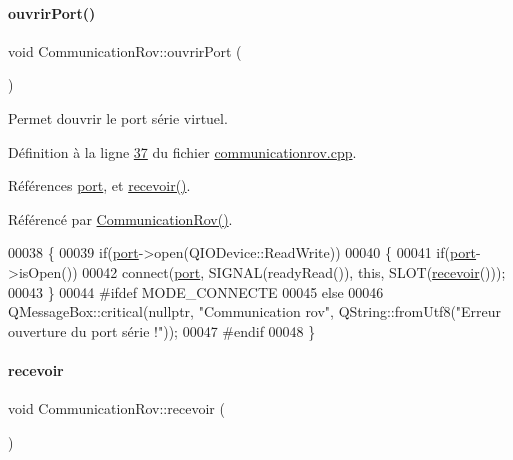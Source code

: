 \paragraph{\texorpdfstring{ouvrir\+Port()}{ouvrirPort()}}
{\footnotesize\ttfamily void Communication\+Rov\+::ouvrir\+Port (\begin{DoxyParamCaption}{ }\end{DoxyParamCaption})}



Permet d\textquotesingle{}ouvrir le port série virtuel. 



Définition à la ligne \hyperlink{communicationrov_8cpp_source_l00037}{37} du fichier \hyperlink{communicationrov_8cpp_source}{communicationrov.\+cpp}.



Références \hyperlink{communicationrov_8h_source_l00042}{port}, et \hyperlink{communicationrov_8cpp_source_l00073}{recevoir()}.



Référencé par \hyperlink{communicationrov_8cpp_source_l00009}{Communication\+Rov()}.


\begin{DoxyCode}
00038 \{
00039     \textcolor{keywordflow}{if}(\hyperlink{class_communication_rov_a21b62067ef0b2a6aec339df60b4abd72}{port}->open(QIODevice::ReadWrite))
00040     \{
00041         \textcolor{keywordflow}{if}(\hyperlink{class_communication_rov_a21b62067ef0b2a6aec339df60b4abd72}{port}->isOpen())
00042             connect(\hyperlink{class_communication_rov_a21b62067ef0b2a6aec339df60b4abd72}{port}, SIGNAL(readyRead()), \textcolor{keyword}{this}, SLOT(\hyperlink{class_communication_rov_a75de69ca01c849f760d7efea1b2722b9}{recevoir}()));
00043     \}
00044 \textcolor{preprocessor}{    #ifdef MODE\_CONNECTE}
00045     \textcolor{keywordflow}{else}
00046         QMessageBox::critical(\textcolor{keyword}{nullptr}, \textcolor{stringliteral}{"Communication rov"}, QString::fromUtf8(\textcolor{stringliteral}{"Erreur ouverture du port
       série !"}));
00047 \textcolor{preprocessor}{    #endif}
00048 \}
\end{DoxyCode}
\mbox{\label{class_communication_rov_a75de69ca01c849f760d7efea1b2722b9}} 
\paragraph{\texorpdfstring{recevoir}{recevoir}}
{\footnotesize\ttfamily void Communication\+Rov\+::recevoir (\begin{DoxyParamCaption}{ }\end{DoxyParamCaption})\hspace{0.3cm}{\ttfamily [slot]}}



